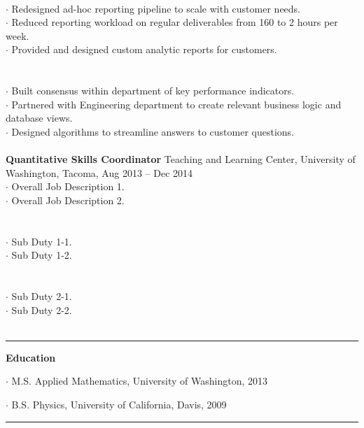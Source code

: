 \documentclass[letterpaper, onecolumn, oneside]{article}
\newcommand{\dotindent}{\hspace*{.25in}$\cdot$ }
\newcommand{\spaceindent}{\hspace*{0.1in}}
\begin{document}
\begin{flushleft}
\spaceindent {\bf Reporting Pipelines} \\
\dotindent Redesigned ad-hoc reporting pipeline to scale with customer needs.\\
\dotindent Reduced reporting workload on regular deliverables from 160 to 2 hours per week.\\
\dotindent Provided and designed custom analytic reports for customers.\\
~\\

\spaceindent {\bf Analytic Infrastructure} \\
\dotindent Built consensus within department of key performance indicators.\\
\dotindent Partnered with Engineering department to create relevant business logic and database views.\\
\dotindent Designed algorithms to streamline answers to customer questions.\\
~\\


\textbf{\large Quantitative Skills Coordinator} Teaching and Learning Center, University of Washington, Tacoma, Aug 2013 -- Dec 2014 \\
\dotindent Overall Job Description 1. \\
\dotindent Overall Job Description 2.\\
~\\

\spaceindent {\bf Major Sub Duty 1} \\
\dotindent Sub Duty 1-1.\\
\dotindent Sub Duty 1-2.\\
~\\

\spaceindent {\bf Major Sub Duty 2} \\
\dotindent Sub Duty 2-1.\\
\dotindent Sub Duty 2-2.\\
~\\

\textcolor{litegrey}{\rule{\textwidth}{.1pt}}

\vspace*{0.1in}
\textbf{\large Education}
\vspace*{0.05in}

\dotindent M.S. Applied Mathematics, University of Washington, 2013

\dotindent B.S. Physics, University of California, Davis, 2009

\textcolor{litegrey}{\rule{\textwidth}{.1pt}}

\end{flushleft}
\end{document}
